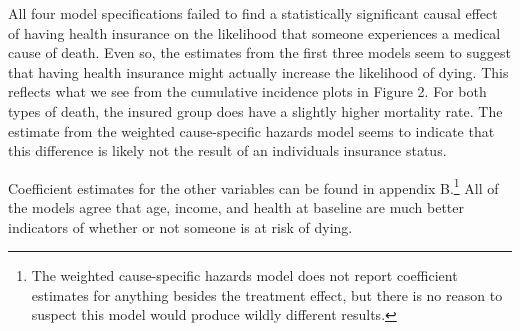 \documentclass{article}
\begin{document}
\begin{table}[!h] \centering 
  \caption{Estimated treatment effect of insurance}
  \label{} 
\end{table} 

All four model specifications failed to find a statistically significant causal effect of having health insurance on the likelihood that someone experiences a medical cause of death. Even so, the estimates from the first three models seem to suggest that having health insurance might actually increase the likelihood of dying. This reflects what we see from the cumulative incidence plots in Figure 2. For both types of death, the insured group does have a slightly higher mortality rate. The estimate from the weighted cause-specific hazards model seems to indicate that this difference is likely not the result of an individuals insurance status. 

\newpage

Coefficient estimates for the other variables can be found in appendix B.\footnote{The weighted cause-specific hazards model does not report coefficient estimates for anything besides the treatment effect, but there is no reason to suspect this model would produce wildly different results.} All of the models agree that age, income, and health at baseline are much better indicators of whether or not someone is at risk of dying. 
\end{document}
